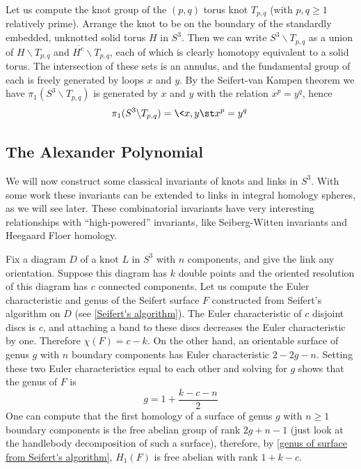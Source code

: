 \begin{example}
Let us compute the knot group of the $(p,q)$ torus knot $T_{p,q}$ (with $p,q \geq 1$ relatively prime). Arrange the knot to be on the boundary of the standardly embedded, unknotted solid torus $H$ in $S^3$. Then we can write $S^3 \backslash T_{p,q}$ as a union of $H \backslash T_{p,q}$ and $\overline{H^c} \backslash T_{p,q}$, each of which is clearly homotopy equivalent to a solid torus. The intersection of these sets is an annulus, and the fundamental group of each is freely generated by loops $x$ and $y$. By the Seifert-van Kampen theorem we have $\pi_1(S^3 \backslash T_{p,q})$ is generated by $x$ and $y$ with the relation $x^p = y^q$, hence
\[ \pi_1(S^3 \backslash T_{p,q}) = \< x,y \st x^p = y^q \> \]
\end{example}



\subsection{The Alexander Polynomial}
\label{The Alexander Polynomial}



We will now construct some classical invariants of knots and links in $S^3$. With some work these invariants can be extended to links in integral homology spheres, as we will see later. These combinatorial invariants have very interesting relationships with ``high-powered'' invariants, like Seiberg-Witten invariants and Heegaard Floer homology.

Fix a diagram $D$ of a knot $L$ in $S^3$ with $n$ components, and give the link any orientation. Suppose this diagram has $k$ double points and the oriented resolution of this diagram has $c$ connected components. Let us compute the Euler characteristic and genus of the Seifert surface $F$ constructed from Seifert's algorithm on $D$ (see \cref{Seifert's algorithm}). The Euler characteristic of $c$ disjoint discs is $c$, and attaching a band to these discs decreases the Euler characteristic by one. Therefore $\chi(F) = c - k$. On the other hand, an orientable surface of genus $g$ with $n$ boundary components has Euler characteristic $2-2g-n$. Setting these two Euler characteristics equal to each other and solving for $g$ shows that the genus of $F$ is 
\begin{equation}
\label{genus of surface from Seifert's algorithm}
g = 1 + \frac{k-c-n}{2}
\end{equation}
One can compute that the first homology of a surface of genus $g$ with $n \geq 1$ boundary components is the free abelian group of rank $2g+n-1$ (just look at the handlebody decomposition of such a surface), therefore, by \eqref{genus of surface from Seifert's algorithm}, $H_1(F)$ is free abelian with rank $1+k-c$. 

